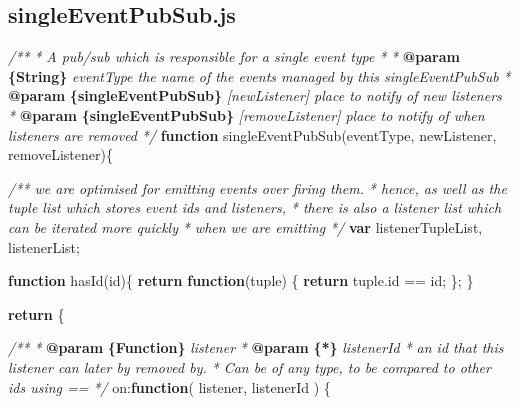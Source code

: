 \documentclass[12pt, ]{article}
\newenvironment{Shaded}{}{}
\newcommand{\KeywordTok}[1]{\textcolor[rgb]{0.00,0.44,0.13}{\textbf{{#1}}}}
\newcommand{\DataTypeTok}[1]{\textcolor[rgb]{0.56,0.13,0.00}{{#1}}}
\newcommand{\CommentTok}[1]{\textcolor[rgb]{0.38,0.63,0.69}{\textit{{#1}}}}
\newcommand{\OtherTok}[1]{\textcolor[rgb]{0.00,0.44,0.13}{{#1}}}
\newcommand{\FunctionTok}[1]{\textcolor[rgb]{0.02,0.16,0.49}{{#1}}}
\newcommand{\NormalTok}[1]{{#1}}
\begin{document}
\pagebreak

\subsection{singleEventPubSub.js}\label{headerux5fsingleEventPubSub}

\label{src_singleEventPubSub}

\begin{Shaded}
\begin{Highlighting}[]
\CommentTok{/** }
\CommentTok{ * A pub/sub which is responsible for a single event type}
\CommentTok{ * }
\CommentTok{ * }\KeywordTok{@param}\CommentTok{ }\KeywordTok{\{String\}}\CommentTok{ eventType                   the name of the events managed by this singleEventPubSub}
\CommentTok{ * }\KeywordTok{@param}\CommentTok{ }\KeywordTok{\{singleEventPubSub\}}\CommentTok{ [newListener]    place to notify of new listeners}
\CommentTok{ * }\KeywordTok{@param}\CommentTok{ }\KeywordTok{\{singleEventPubSub\}}\CommentTok{ [removeListener] place to notify of when listeners are removed}
\CommentTok{ */}
\KeywordTok{function} \FunctionTok{singleEventPubSub}\NormalTok{(eventType, newListener, removeListener)\{}

   \CommentTok{/** we are optimised for emitting events over firing them.}
\CommentTok{    *  hence, as well as the tuple list which stores event ids and listeners,}
\CommentTok{    *  there is also a listener list which can be iterated more quickly}
\CommentTok{    *  when we are emitting}
\CommentTok{    */}
   \KeywordTok{var} \NormalTok{listenerTupleList,}
       \NormalTok{listenerList;}

   \KeywordTok{function} \FunctionTok{hasId}\NormalTok{(id)\{}
      \KeywordTok{return} \KeywordTok{function}\NormalTok{(tuple) \{}
         \KeywordTok{return} \OtherTok{tuple}\NormalTok{.}\FunctionTok{id} \NormalTok{== id;      }
      \NormalTok{\};  }
   \NormalTok{\}}
              
   \KeywordTok{return} \NormalTok{\{}

      \CommentTok{/**}
\CommentTok{       * }\KeywordTok{@param}\CommentTok{ }\KeywordTok{\{Function\}}\CommentTok{ listener}
\CommentTok{       * }\KeywordTok{@param}\CommentTok{ }\KeywordTok{\{*\}}\CommentTok{ listenerId }
\CommentTok{       *    an id that this listener can later by removed by. }
\CommentTok{       *    Can be of any type, to be compared to other ids using ==}
\CommentTok{       */}
      \DataTypeTok{on}\NormalTok{:}\KeywordTok{function}\NormalTok{( listener, listenerId ) \{}
         

\end{Highlighting}
\end{Shaded}
\end{document}
